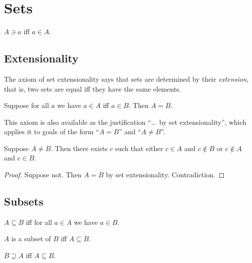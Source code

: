 
\section{Sets}

\begin{abbreviation}\label{ni}
    $A\ni a$ iff $a\in A$.
\end{abbreviation}

\subsection{Extensionality}

The axiom of set extensionality says that sets are determined by their \textit{extension},
that is, two sets are equal iff they have the same elements.
%
\begin{axiom}\label{setext}
    Suppose for all $a$ we have $a\in A$ iff $a\in B$.
    Then $A = B$.
\end{axiom}

This axiom is also available as the justification “{\ldots\ by set extensionality}”,
which applies it to goals of the form “$A = B$” and  “$A \neq B$”.

\begin{proposition}%
\label{neq_witness}
    Suppose $A\neq B$.
    Then there exists $c$ such that
    either $c\in A$ and $c\not\in B$
    or $c\not\in A$ and $c\in B$.
\end{proposition}
\begin{proof}
    Suppose not. Then $A = B$ by set extensionality. Contradiction.
\end{proof}


\subsection{Subsets}

\begin{definition}\label{subseteq}
    $A\subseteq B$ iff
    for all $a\in A$ we have $a\in B$.
\end{definition}

\begin{abbreviation}\label{is_subset}
    $A$ is a subset of $B$ iff $A\subseteq B$.
\end{abbreviation}

\begin{abbreviation}\label{supseteq}
    $B\supseteq A$ iff $A\subseteq B$.
\end{abbreviation}

